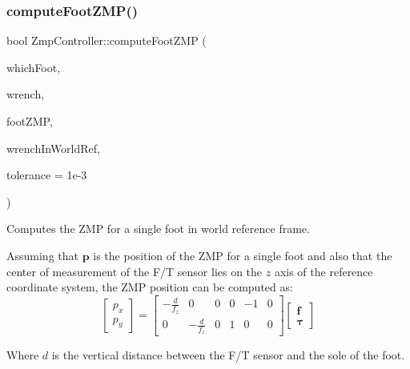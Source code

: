 \subsubsection{\texorpdfstring{compute\+Foot\+Z\+M\+P()}{computeFootZMP()}}
{\footnotesize\ttfamily bool Zmp\+Controller\+::compute\+Foot\+Z\+MP (\begin{DoxyParamCaption}\item[{\hyperlink{ZmpController_8h_a4b6a8e135f90bd56e5a57a60efb42529}{F\+O\+OT}}]{which\+Foot,  }\item[{Eigen\+::\+Vector\+Xd}]{wrench,  }\item[{Eigen\+::\+Vector2d \&}]{foot\+Z\+MP,  }\item[{Eigen\+::\+Vector\+Xd \&}]{wrench\+In\+World\+Ref,  }\item[{const double}]{tolerance = {\ttfamily 1e-\/3} }\end{DoxyParamCaption})}

Computes the Z\+MP for a single foot in world reference frame.

Assuming that $\mathbf{p}$ is the position of the Z\+MP for a single foot and also that the center of measurement of the F/T sensor lies on the $z$ axis of the reference coordinate system, the Z\+MP position can be computed as\+: \[ \left[\begin{array}{c}p_x \\ p_y \end{array}\right] = \left[\begin{array}{cccccc} -\frac{d}{f_z} & 0 & 0 & 0 & -1 & 0 \\ 0 & -\frac{d}{f_z} & 0 & 1 & 0 & 0 \end{array}\right] \left[\begin{array}{c} \mathbf{f}\\ \mathbf{\tau} \end{array}\right] \]

Where $d$ is the vertical distance between the F/T sensor and the sole of the foot.


